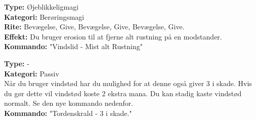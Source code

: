 \begin{vind*}[Vindslid]
\textbf{Type:} Øjeblikkeligmagi\\
\textbf{Kategori:} Berøringsmagi\\
\textbf{Rite:} Bevægelse, Give, Bevægelse, Give, Bevægelse, Give.\\
\textbf{Effekt:} Du bruger erosion til at fjerne alt rustning på en modstander.\\
\textbf{Kommando:} "Vindslid - Mist alt Rustning"
\end{vind*}

\begin{vind*}[Tordenskrald]
\textbf{Type:} -\\
\textbf{Kategori:} Passiv\\
Når du bruger vindstød har du mulighed for at denne også giver 3 i skade. Hvis du gør dette vil vindstød koste 2 ekstra mana. Du kan stadig kaste vindstød normalt. Se den nye kommando nedenfor.\\
\textbf{Kommando:} "Tordenskrald - 3 i skade."
\end{vind*}
